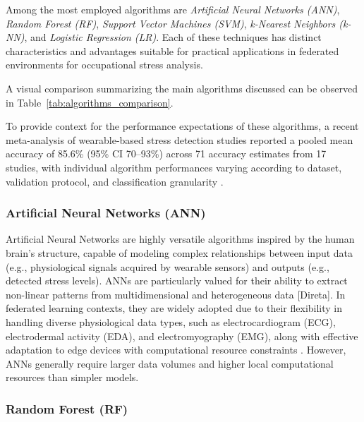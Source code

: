 \documentclass[12pt]{article}
\begin{document}
Among the most employed algorithms are \textit{Artificial Neural Networks (ANN)}, \textit{Random Forest (RF)}, \textit{Support Vector Machines (SVM)}, \textit{k-Nearest Neighbors (k-NN)}, and \textit{Logistic Regression (LR)}. Each of these techniques has distinct characteristics and advantages suitable for practical applications in federated environments for occupational stress analysis.

A visual comparison summarizing the main algorithms discussed can be observed in Table~\ref{tab:algorithms_comparison}.

To provide context for the performance expectations of these algorithms, a recent meta-analysis of wearable-based stress detection studies reported a pooled mean accuracy of 85.6\% (95\% CI 70--93\%) across 71 accuracy estimates from 17 studies, with individual algorithm performances varying according to dataset, validation protocol, and classification granularity \cite{alaa_abd-alrazaq_e52622}.

\subsubsection{Artificial Neural Networks (ANN)}

Artificial Neural Networks are highly versatile algorithms inspired by the human brain's structure, capable of modeling complex relationships between input data (e.g., physiological signals acquired by wearable sensors) and outputs (e.g., detected stress levels). ANNs are particularly valued for their ability to extract non-linear patterns from multidimensional and heterogeneous data \cite{abdulrahman_alahmadi_32bc288c} [Direta]. In federated learning contexts, they are widely adopted due to their flexibility in handling diverse physiological data types, such as electrocardiogram (ECG), electrodermal activity (EDA), and electromyography (EMG), along with effective adaptation to edge devices with computational resource constraints \cite{abdulrahman_alahmadi_32bc288c}. However, ANNs generally require larger data volumes and higher local computational resources than simpler models.

\subsubsection{Random Forest (RF)}
\end{document}
